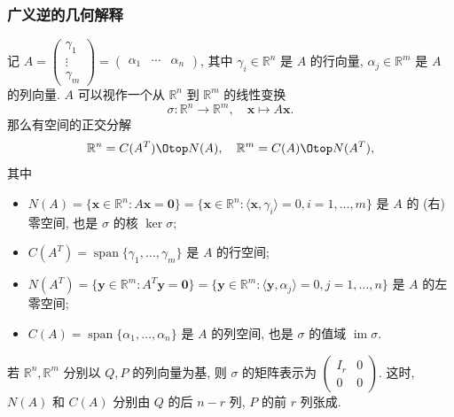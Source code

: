 \begin{frame}
\frametitle{广义逆的几何解释}

记 $A = \begin{pmatrix} \gamma_1 \\ \vdots \\ \gamma_m \end{pmatrix} = \begin{pmatrix} \alpha_1 & \cdots & \alpha_n \end{pmatrix}$, 其中 $\gamma_i \in \mathbb{R}^n$ 是 $A$ 的行向量, $\alpha_j \in \mathbb{R}^m$ 是 $A$ 的列向量. $A$ 可以视作一个从 $\mathbb{R}^n$ 到 $\mathbb{R}^m$ 的线性变换
\[
\sigma: \mathbb{R}^n \to \mathbb{R}^m, \quad \mathbf{x} \mapsto A\mathbf{x}.
\]
那么有空间的正交分解
\[
\mathbb{R}^n = C(A^T) \Otop N(A), \quad \mathbb{R}^m = C(A) \Otop N(A^T),
\]
其中
\begin{itemize}
\item $N(A) = \{\mathbf{x}\in \mathbb{R}^n: A\mathbf{x} = \mathbf{0}\} = \{\mathbf{x}\in \mathbb{R}^n: \langle \mathbf{x}, \gamma_i \rangle = 0, i=1,\ldots,m\}$ 是 $A$ 的 (右) 零空间, 也是 $\sigma$ 的核 $\ker \sigma;$
\item $C(A^T) = \operatorname{span}\{\gamma_1, \ldots, \gamma_m\}$ 是 $A$ 的行空间;
\item $N(A^T) = \{\mathbf{y}\in \mathbb{R}^m: A^T\mathbf{y} = \mathbf{0}\} = \{\mathbf{y}\in \mathbb{R}^m: \langle \mathbf{y}, \alpha_j \rangle = 0, j=1,\ldots,n\}$ 是 $A$ 的左零空间;
\item $C(A) = \operatorname{span}\{\alpha_1, \ldots, \alpha_n\}$ 是 $A$ 的列空间, 也是 $\sigma$ 的值域 $\operatorname{im} \sigma.$
\end{itemize}

\pause

\begin{remark}
若 $\mathbb{R}^n, \mathbb{R}^m$ 分别以 $Q, P$ 的列向量为基, 则 $\sigma$ 的矩阵表示为 $\begin{pmatrix} I_r & 0 \\ 0 & 0 \end{pmatrix}.$ 这时, $N(A)$ 和 $C(A)$ 分别由 $Q$ 的后 $n-r$ 列, $P$ 的前 $r$ 列张成.
\end{remark}

\end{frame}


